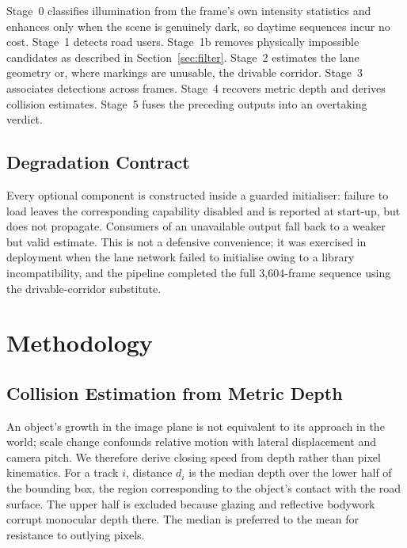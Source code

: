 \documentclass[conference]{IEEEtran}
\begin{document}
Stage~0 classifies illumination from the frame's own intensity statistics and
enhances only when the scene is genuinely dark, so daytime sequences incur no
cost. Stage~1 detects road users. Stage~1b removes physically impossible
candidates as described in Section~\ref{sec:filter}. Stage~2 estimates the lane
geometry or, where markings are unusable, the drivable corridor. Stage~3
associates detections across frames. Stage~4 recovers metric depth and derives
collision estimates. Stage~5 fuses the preceding outputs into an overtaking
verdict.

\subsection{Degradation Contract}

Every optional component is constructed inside a guarded initialiser: failure to
load leaves the corresponding capability disabled and is reported at start-up,
but does not propagate. Consumers of an unavailable output fall back to a
weaker but valid estimate. This is not a defensive convenience; it was exercised
in deployment when the lane network failed to initialise owing to a library
incompatibility, and the pipeline completed the full 3{,}604-frame sequence using
the drivable-corridor substitute.

\section{Methodology}

\subsection{Collision Estimation from Metric Depth}

An object's growth in the image plane is not equivalent to its approach in the
world; scale change confounds relative motion with lateral displacement and
camera pitch. We therefore derive closing speed from depth rather than pixel
kinematics. For a track $i$, distance $d_i$ is the median depth over the lower
half of the bounding box, the region corresponding to the object's contact with
the road surface. The upper half is excluded because glazing and reflective
bodywork corrupt monocular depth there. The median is preferred to the mean for
resistance to outlying pixels.
\end{document}
